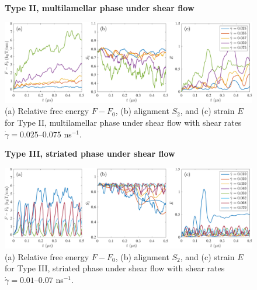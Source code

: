 \begin{figure}[h!]
\textbf{Type II, multilamellar phase under shear flow}\par\medskip
\begin{center}
\includegraphics[width=\textwidth]{FigureS3.pdf}
\end{center}
\caption{(a) Relative free energy $F - F_0$, (b) alignment $S_2$, and
  (c) strain $E$ for Type II, multilamellar phase under shear flow with
  shear rates $\dot\gamma=0.025$--$0.075$ ns$^{-1}$.
}
\label{fig:mlshraw}
\end{figure}


\begin{figure}[h!]
\textbf{Type III, striated phase under shear flow}\par\medskip
\begin{center}
\includegraphics[width=\textwidth]{FigureS4.pdf}
\end{center}
\caption{(a) Relative free energy $F - F_0$, (b) alignment $S_2$, and
  (c) strain $E$ for Type III, striated phase under shear flow with
  shear rates $\dot\gamma=0.01$--$0.07$ ns$^{-1}$.
}
\label{fig:stshraw}
\end{figure}

